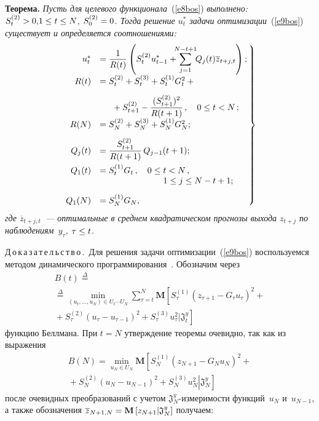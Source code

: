 \begin{multicols}{2}
  \noindent
  \textbf{Теорема.}
  \textit{Пусть для целевого функционала}~(\ref{e8bos}) \textit{выполнено: 
$S_t^{(2)}\hm>0{,}1\hm\leq t\hm\leq N$, $S_0^{(2)}\hm=0$. Тогда решение $u_t^*$ задачи 
оптимизации}~(\ref{e9bos}) \textit{существует и определяется соотношениями:}
  \begin{equation}
  \hspace*{-2.7mm}\left.
\begin{array}{rl}
u_t^* &=\displaystyle\fr{1}{R(t)}\left ( S_t^{(2)} u_{t-1}^*+\!\!\!\sum\limits_{j=1}^{N-t+1}\!\! 
Q_j(t)\overline{z}_{t+j,t}\right);\\[9pt]
R(t) &=S_t^{(2)}+S_t^{(3)}+S_t^{(1)}G_t^2+{}\\[9pt]
&\hspace*{5mm}{}+S_{t+1}^{(2)}-
\fr{(S_{t+1}^{(2)})^2}{R(t+1)}\,,\quad  0\leq t<N\,;\\
R(N) &=S_N^{(2)}+S_N^{(3)}+S_N^{(1)}G_N^2;\\[9pt]
Q_j(t) &=\fr{S_{t+1}^{(2)}}{R(t+1)}\,Q_{j-1}(t+1);\\[9pt]
Q_1(t)&=S_t^{(1)}G_t\,,\quad  0\leq t<N\,,\\
&\hspace*{26mm} 1\leq j\leq N-t+1;\\[9pt]
Q_1(N) &=S_N^{(1)} G_N,
  \end{array}\!\!
  \right\}\!\!\!
  \label{e10bos}
  \end{equation}
\textit{где $\overline{z}_{t+j,t}$~--- оптимальные в среднем квадратическом прогнозы 
выхода $z_{t+j}$ по наблюдениям~$y_\tau$, $\tau\hm\leq t$.}

\smallskip

\noindent
  Д\,о\,к\,а\,з\,а\,т\,е\,л\,ь\,с\,т\,в\,о\,.\ Для решения задачи оптимизации~(\ref{e9bos}) 
воспользуемся методом динамического программирования~\cite{8bos, 7bos}. Обозначим 
через
  \begin{multline*}
  B(t) \overset{\Delta}{=}{}\\
{}\overset{\Delta}{=}   \min\limits_{(u_t,\ldots ,u_N)\in U_t\cdots 
U_N}\sum\limits_{\tau=t}^N \mathbf{M}\left[ S_\tau^{(1)}\left( z_{\tau+1}-G_\tau 
u_\tau\right)^2+{}\right.\\
\left.{}+ S_\tau^{(2)}\left (u_\tau-u_{\tau-1}\right)^2+S_\tau^{(3)}u_\tau^2\vert 
\mathfrak{J}_t^y\right]
  \end{multline*}
функцию Беллмана. При $t=N$ утверждение теоремы очевидно, так как  из выражения
\begin{multline*}
B(N) =\min\limits_{u_N\in U_N} \mathbf{M}\left[
S_N^{(1)}\left( z_{N+1}-G_Nu_N\right)^2+{}\right.\\
\left.\left.{}+S_N^{(2)}\left( u_N-u_{N-1}\right)^2+S_N^{(3)}u_N^2
\right\vert
\mathfrak{J}_N^y\right]
\end{multline*}
после очевидных преобразований с учетом $\mathfrak{J}_N^y$-из\-ме\-ри\-мости 
функций~$u_N$ и~$u_{N-1}$, а также обозначения $\overline{z}_{N+1,N}\hm = \mathbf{M} 
\left[ z_{N+1}\vert \mathfrak{J}_N^y\right]$ получаем:


\end{multicols}

